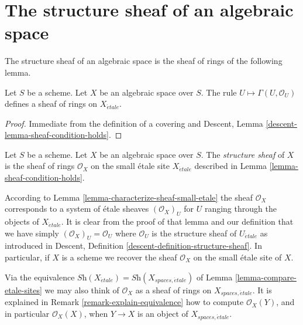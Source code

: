 \section{The structure sheaf of an algebraic space}
\label{section-structure sheaf}

\noindent
The structure sheaf of an algebraic space is the sheaf of rings of the
following lemma.

\begin{lemma}
\label{lemma-sheaf-condition-holds}
Let $S$ be a scheme. Let $X$ be an algebraic space over $S$.
The rule $U \mapsto \Gamma(U, \mathcal{O}_U)$ defines
a sheaf of rings on $X_{\acute{e}tale}$.
\end{lemma}

\begin{proof}
Immediate from the definition of a covering and
Descent, Lemma \ref{descent-lemma-sheaf-condition-holds}.
\end{proof}

\begin{definition}
\label{definition-structure-sheaf}
Let $S$ be a scheme.
Let $X$ be an algebraic space over $S$.
The {\it structure sheaf} of $X$
is the sheaf of rings $\mathcal{O}_X$
on the small \'etale site $X_{\acute{e}tale}$ described in
Lemma \ref{lemma-sheaf-condition-holds}.
\end{definition}

\noindent
According to Lemma \ref{lemma-characterize-sheaf-small-etale} the sheaf
$\mathcal{O}_X$ corresponds to a system of \'etale sheaves $(\mathcal{O}_X)_U$
for $U$ ranging through the objects of $X_{\acute{e}tale}$. It is clear from
the proof of that lemma and our definition that we have simply
$(\mathcal{O}_X)_U = \mathcal{O}_U$ where $\mathcal{O}_U$ is the structure
sheaf of $U_{\acute{e}tale}$ as introduced in
Descent, Definition \ref{descent-definition-structure-sheaf}.
In particular, if $X$ is a scheme we recover the sheaf $\mathcal{O}_X$
on the small \'etale site of $X$.

\medskip\noindent
Via the equivalence
$\textit{Sh}(X_{\acute{e}tale}) = \textit{Sh}(X_{spaces, \acute{e}tale})$
of Lemma \ref{lemma-compare-etale-sites} we may also think of $\mathcal{O}_X$
as a sheaf of rings on $X_{spaces, \acute{e}tale}$. It is explained in
Remark \ref{remark-explain-equivalence}
how to compute $\mathcal{O}_X(Y)$, and in particular $\mathcal{O}_X(X)$, when
$Y \to X$ is an object of $X_{spaces, \acute{e}tale}$.

